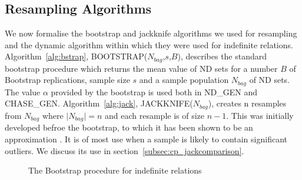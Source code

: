 \subsection{Resampling Algorithms}\label{sec:cp_resalg}

We now formalise the bootstrap and jackknife algorithms we used for
resampling and the dynamic algorithm within which they were used for
indefinite relations.
Algorithm~\ref{alg:bstrap}, BOOTSTRAP($N_{bag}$,$s$,$B$),
describes the standard bootstrap procedure which returns the mean value
of ND sets for a number $B$ of Bootstrap replications, sample size $s$ and a
sample population $N_{bag}$ of ND sets. The value $\alpha$
provided by the bootstrap is used both in ND\_GEN and CHASE\_GEN.
Algorithm~\ref{alg:jack}, JACKKNIFE($N_{bag}$), creates n resamples
from $N_{bag}$ where $\mid N_{bag} \mid = n$ and each resample is of
size $n - 1$. This was initially developed befroe the bootstrap, to
which it has been shown to be an approximation \cite{et86}. It is of
most use when a sample is likely to contain significant outliers. We
discuss its use in section~\ref{subsec:cp_jackcomparison}. 


{\line
\begin{figure}[ht]
\begin{center}
\caption{\label{cp:fig:bootstrap} The Bootstrap procedure for
indefinite relations}
\end{center}
\end{figure}
}


